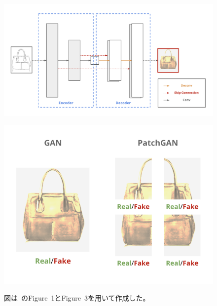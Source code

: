 \begin{figure}[b]
\centering
\begin{minipage}[b]{0.58\columnwidth}
\centering
\includegraphics[width=0.9\columnwidth]{figure/u-net.png}
\label{fig:u-net}
\end{minipage}
\begin{minipage}[b]{0.4\columnwidth}
\centering
\includegraphics[width=0.9\columnwidth]{figure/patchgan.png}
\label{fig:patchgan}
\end{minipage}
\caption[Pix2pixの生成モデルと識別モデル]{図は~\cite{pix2pix}のFigure~1とFigure~3を用いて作成した。}
\end{figure}